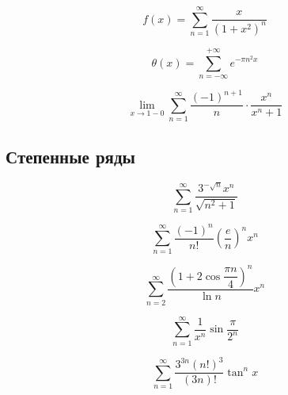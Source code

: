 \documentclass[a4paper,14pt]{article}
\begin{document}
\setcounter{equation}{2794}
\begin{equation}
f(x)=\sum\limits_{n=1}^{\infty} \dfrac{x}{(1+x^2)^n}
\end{equation}

\setcounter{equation}{2797}

\begin{equation}
\theta(x)=\sum\limits_{n=-\infty}^{+\infty} e^{-\pi n^2 x}
\end{equation}

\setcounter{equation}{2805}

\begin{equation}
\lim_{x \to 1-0} \sum\limits_{n=1}^{\infty} \dfrac{(-1)^ {n+1} }{n} \cdot \frac{x^n}{x^n+1}
\end{equation}



\subsection{Степенные ряды}

\setcounter{equation}{2823}

\begin{equation}
\sum\limits_{n=1}^{\infty}\dfrac{3^{-\sqrt{n}}x^{n}}{\sqrt{n^2+1}}
\end{equation}

\setcounter{equation}{2825}

\begin{equation}
\sum\limits_{n=1}^{\infty} \dfrac{(-1)^n}{n!} \left(\dfrac{e}{n}\right)^n x^n
\end{equation}

\setcounter{equation}{2829}

\begin{equation}
\sum\limits_{n=2}^{\infty}\dfrac{\left( 1+2\cos \dfrac{\pi n}{4} \right)^n }{\ln n} x^n
\end{equation}

\setcounter{equation}{2833}

\begin{equation}
\sum\limits_{n=1}^{\infty} \dfrac{1}{x^n} \sin \frac{\pi}{2^n}
\end{equation}

\setcounter{equation}{2836}

\begin{equation}
\sum\limits_{n=1}^{\infty}\dfrac{3^{3n}\left(n!\right)^3}{\left( 3n \right)!} \tan ^n x
\end{equation}
\end{document}
